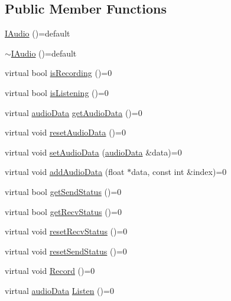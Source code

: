 \subsection*{Public Member Functions}
\begin{DoxyCompactItemize}
\item 
\hyperlink{classBabel_1_1audio_1_1IAudio_a6061e3258ed8ab56528209d65d3de5c1}{I\+Audio} ()=default
\item 
\hyperlink{classBabel_1_1audio_1_1IAudio_a4185868653e1d68d8f8b9b5988463724}{$\sim$\+I\+Audio} ()=default
\item 
virtual bool \hyperlink{classBabel_1_1audio_1_1IAudio_ad6660dbdc5c0448c67d3a2265eefd9a9}{is\+Recording} ()=0
\item 
virtual bool \hyperlink{classBabel_1_1audio_1_1IAudio_af11d02c62648df4fdf25dd6dbc64904b}{is\+Listening} ()=0
\item 
virtual \hyperlink{structaudioData}{audio\+Data} \hyperlink{classBabel_1_1audio_1_1IAudio_ae80294d5441717125361d1fd0a65b9cf}{get\+Audio\+Data} ()=0
\item 
virtual void \hyperlink{classBabel_1_1audio_1_1IAudio_a879bde00b067128659a6108a883a10f7}{reset\+Audio\+Data} ()=0
\item 
virtual void \hyperlink{classBabel_1_1audio_1_1IAudio_a6bac02d16b744cd8c81e5dd67636db0f}{set\+Audio\+Data} (\hyperlink{structaudioData}{audio\+Data} \&data)=0
\item 
virtual void \hyperlink{classBabel_1_1audio_1_1IAudio_a9e36fb7ef439a3193cd104b340d7215c}{add\+Audio\+Data} (float $\ast$data, const int \&index)=0
\item 
virtual bool \hyperlink{classBabel_1_1audio_1_1IAudio_a82e0b4db1206688c792221ce253ca5cc}{get\+Send\+Status} ()=0
\item 
virtual bool \hyperlink{classBabel_1_1audio_1_1IAudio_a9a1da6f7226da4a5bd14a5bbd12b66dc}{get\+Recv\+Status} ()=0
\item 
virtual void \hyperlink{classBabel_1_1audio_1_1IAudio_ab3bd4c604b1a0e1611f280b1d27fe16b}{reset\+Recv\+Status} ()=0
\item 
virtual void \hyperlink{classBabel_1_1audio_1_1IAudio_a76c3b8c9e9dd82f13ec7684b453d7f2c}{reset\+Send\+Status} ()=0
\item 
virtual void \hyperlink{classBabel_1_1audio_1_1IAudio_a35c021d9d38ffeeec1aa8c6890e30151}{Record} ()=0
\item 
virtual \hyperlink{structaudioData}{audio\+Data} \hyperlink{classBabel_1_1audio_1_1IAudio_a2b7c300088982a040edc5f9f203c94df}{Listen} ()=0
\end{DoxyCompactItemize}


